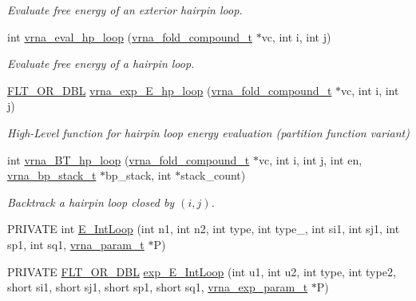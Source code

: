 \begin{DoxyCompactItemize}
\begin{DoxyCompactList}\small\item\em Evaluate free energy of an exterior hairpin loop. \end{DoxyCompactList}\item 
int \hyperlink{group__loops_gab3eb4651dc26dc2b653a57dd340d7e68}{vrna\+\_\+eval\+\_\+hp\+\_\+loop} (\hyperlink{group__fold__compound_ga1b0cef17fd40466cef5968eaeeff6166}{vrna\+\_\+fold\+\_\+compound\+\_\+t} $\ast$vc, int i, int j)
\begin{DoxyCompactList}\small\item\em Evaluate free energy of a hairpin loop. \end{DoxyCompactList}\item 
\hyperlink{group__data__structures_ga31125aeace516926bf7f251f759b6126}{F\+L\+T\+\_\+\+O\+R\+\_\+\+D\+BL} \hyperlink{group__loops_gac9f49b31d3ec1d9040798b05506c71da}{vrna\+\_\+exp\+\_\+\+E\+\_\+hp\+\_\+loop} (\hyperlink{group__fold__compound_ga1b0cef17fd40466cef5968eaeeff6166}{vrna\+\_\+fold\+\_\+compound\+\_\+t} $\ast$vc, int i, int j)
\begin{DoxyCompactList}\small\item\em High-\/\+Level function for hairpin loop energy evaluation (partition function variant) \end{DoxyCompactList}\item 
int \hyperlink{group__loops_ga6c4ba14d24f716d0ca9021771357e903}{vrna\+\_\+\+B\+T\+\_\+hp\+\_\+loop} (\hyperlink{group__fold__compound_ga1b0cef17fd40466cef5968eaeeff6166}{vrna\+\_\+fold\+\_\+compound\+\_\+t} $\ast$vc, int i, int j, int en, \hyperlink{group__data__structures_gaa651bda42e7692f08cb603cd6834b0ee}{vrna\+\_\+bp\+\_\+stack\+\_\+t} $\ast$bp\+\_\+stack, int $\ast$stack\+\_\+count)
\begin{DoxyCompactList}\small\item\em Backtrack a hairpin loop closed by $ (i,j) $. \end{DoxyCompactList}\item 
P\+R\+I\+V\+A\+TE int \hyperlink{group__loops_gaafbc187b7f78e8e82afb77dd6f3b8fc5}{E\+\_\+\+Int\+Loop} (int n1, int n2, int type, int type\+\_, int si1, int sj1, int sp1, int sq1, \hyperlink{group__energy__parameters_ga8a69ca7d787e4fd6079914f5343a1f35}{vrna\+\_\+param\+\_\+t} $\ast$P)
\item 
P\+R\+I\+V\+A\+TE \hyperlink{group__data__structures_ga31125aeace516926bf7f251f759b6126}{F\+L\+T\+\_\+\+O\+R\+\_\+\+D\+BL} \hyperlink{group__loops_ga95de54d8a2a17645a95e0f34e189d9c9}{exp\+\_\+\+E\+\_\+\+Int\+Loop} (int u1, int u2, int type, int type2, short si1, short sj1, short sp1, short sq1, \hyperlink{group__energy__parameters_ga01d8b92fe734df8d79a6169482c7d8d8}{vrna\+\_\+exp\+\_\+param\+\_\+t} $\ast$P)

\end{DoxyCompactItemize}
